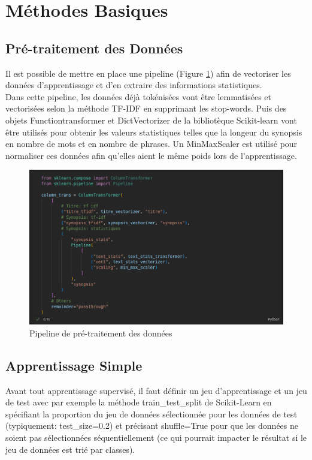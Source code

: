 \section{Méthodes Basiques}

\subsection{Pré-traitement des Données}
Il est possible de mettre en place une pipeline (Figure \ref{pipeline_1}) afin de vectoriser les données d'apprentissage et d'en extraire des informations statistiques.\\
Dans cette pipeline, les données déjà tokénisées vont être lemmatisées et vectorisées selon la méthode TF-IDF en supprimant les stop-words. Puis des objets \textsf{Functiontransformer} et \textsf{DictVectorizer} de la bibliotèque Scikit-learn \cite{scikit_learn} vont être utilisés pour obtenir les valeurs statistiques telles que la longeur du synopsis en nombre de mots et en nombre de phrases. Un \textsf{MinMaxScaler} est utilisé pour normaliser ces données afin qu'elles aient le même poids lors de l'apprentissage.

\begin{figure}
    \center
    \includegraphics[scale=.3]{img/pipeline_1.png}
    \caption{Pipeline de pré-traitement des données}
    \label{pipeline_1}
\end{figure}

\subsection{Apprentissage Simple}
Avant tout apprentissage supervisé, il faut définir un jeu d'apprentissage et un jeu de test avec par exemple la méthode \textsf{train\_test\_split} de Scikit-Learn en spécifiant la proportion du jeu de données sélectionnée pour les données de test (typiquement: \textsf{test\_size=0.2}) et précisant \textsf{shuffle=True} pour que les données ne soient pas sélectionnées séquentiellement (ce qui pourrait impacter le résultat si le jeu de données est trié par classes).

